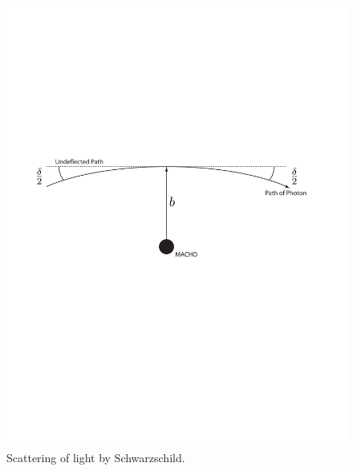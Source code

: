 \begin{figure}[p]
\begin{center}
\includegraphics[width=\linewidth]{figures/macho/scattering}
\end{center}
\caption[Scattering of Light in Schwarzschild Spacetime]{%
\label{f:scattering}%
Scattering of light by Schwarzschild.
}
\end{figure}

